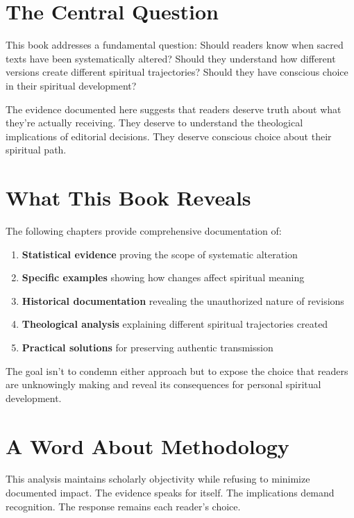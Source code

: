 \documentclass[11pt,twoside]{book}
\begin{document}
\section*{The Central Question}
\label{sec:org0a55b51}

This book addresses a fundamental question: Should readers know when sacred texts have been systematically altered? Should they understand how different versions create different spiritual trajectories? Should they have conscious choice in their spiritual development?

The evidence documented here suggests that readers deserve truth about what they're actually receiving. They deserve to understand the theological implications of editorial decisions. They deserve conscious choice about their spiritual path.
\section*{What This Book Reveals}
\label{sec:org7c0e079}

The following chapters provide comprehensive documentation of:

\begin{enumerate}
\item \textbf{\textbf{Statistical evidence}} proving the scope of systematic alteration
\item \textbf{\textbf{Specific examples}} showing how changes affect spiritual meaning
\item \textbf{\textbf{Historical documentation}} revealing the unauthorized nature of revisions
\item \textbf{\textbf{Theological analysis}} explaining different spiritual trajectories created
\item \textbf{\textbf{Practical solutions}} for preserving authentic transmission
\end{enumerate}

The goal isn't to condemn either approach but to expose the choice that readers are unknowingly making and reveal its consequences for personal spiritual development.
\section*{A Word About Methodology}
\label{sec:org310ce11}

This analysis maintains scholarly objectivity while refusing to minimize documented impact. The evidence speaks for itself. The implications demand recognition. The response remains each reader's choice.
\end{document}
